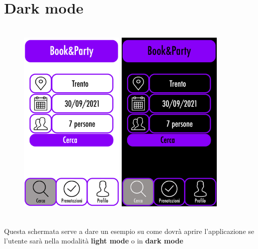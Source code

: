 \section{Dark mode}
\begin{figure}[h]
    \centering
    \includegraphics[width=5cm, height=10cm]{mockup/03-cerca-cliente.jpg}
    \qquad\qquad
    \includegraphics[width=5cm, height=10cm]{mockup/11-dark-mode.jpg}
    \label{fig:profioLocale}
\end{figure}

Questa schermata serve a dare un esempio su come dovrà aprire l'applicazione se l'utente sarà
nella modalità \textbf{light mode} o in \textbf{dark mode}